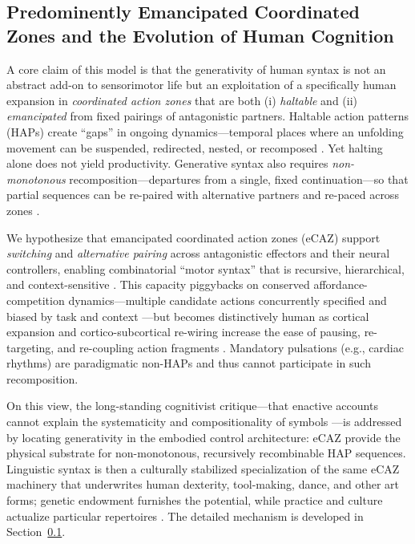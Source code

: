 \subsection{Predominently Emancipated Coordinated Zones and the Evolution of Human Cognition}\label{emancipated}

A core claim of this model is that the generativity of human syntax is not an abstract add-on to sensorimotor life but an exploitation of a specifically human expansion in \emph{coordinated action zones} that are both (i) \emph{haltable} and (ii) \emph{emancipated} from fixed pairings of antagonistic partners. Haltable action patterns (HAPs) create “gaps” in ongoing dynamics—temporal places where an unfolding movement can be suspended, redirected, nested, or recomposed \citep{Aron2014InhibitionKelso1995DynamicPatterns}. Yet halting alone does not yield productivity. Generative syntax also requires \emph{non-monotonous} recomposition—departures from a single, fixed continuation—so that partial sequences can be re-paired with alternative partners and re-paced across zones \citep{Lashley1951SerialOrder,Chomsky1957SyntacticStructures}.

We hypothesize that emancipated coordinated action zones (eCAZ) support \emph{switching} and \emph{alternative pairing} across antagonistic effectors and their neural controllers, enabling combinatorial “motor syntax” that is recursive, hierarchical, and context-sensitive \citep{Bizzi2005ModularControl,Koechlin2007PrefrontalHierarchy,Schieber2004HandSynergies}. This capacity piggybacks on conserved affordance-competition dynamics—multiple candidate actions concurrently specified and biased by task and context \citep{Cisek2010AffordanceCompetition,Pezzulo2016AffordanceLandscape}—but becomes distinctively human as cortical expansion and cortico-subcortical re-wiring increase the ease of pausing, re-targeting, and re-coupling action fragments \citep{PascualLeone2005CorticalPlasticity,Grafton2007MotorCognition}. Mandatory pulsations (e.g., cardiac rhythms) are paradigmatic non-HAPs and thus cannot participate in such recomposition.

On this view, the long-standing cognitivist critique—that enactive accounts cannot explain the systematicity and compositionality of symbols \citep{FodorPylyshyn1988Systematicity,Harnad1990SymbolGrounding}—is addressed by locating generativity in the embodied control architecture: eCAZ provide the physical substrate for non-monotonous, recursively recombinable HAP sequences. Linguistic syntax is then a culturally stabilized specialization of the same eCAZ machinery that underwrites human dexterity, tool-making, dance, and other art forms; genetic endowment furnishes the potential, while practice and culture actualize particular repertoires \citep{Laland2017DarwinCulture,HuttoMyin2013RadicalizingEnactivism}. The detailed mechanism is developed in Section~\ref{emancipated}.

